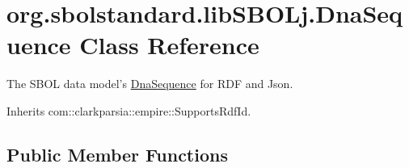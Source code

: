\hypertarget{classorg_1_1sbolstandard_1_1lib_s_b_o_lj_1_1_dna_sequence}{
\section{org.sbolstandard.libSBOLj.DnaSequence Class Reference}
\label{classorg_1_1sbolstandard_1_1lib_s_b_o_lj_1_1_dna_sequence}
}


The SBOL data model's \hyperlink{classorg_1_1sbolstandard_1_1lib_s_b_o_lj_1_1_dna_sequence}{DnaSequence} for RDF and Json.  




Inherits com::clarkparsia::empire::SupportsRdfId.

\subsection*{Public Member Functions}
